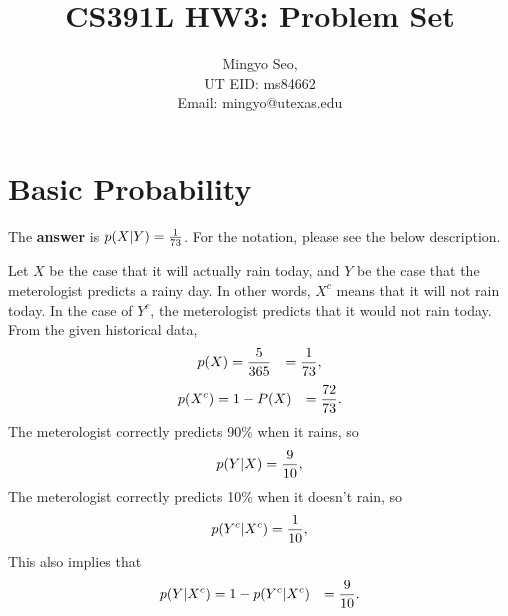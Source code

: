 \documentclass[journal,onecolumn,12pt]{IEEEtran}
\begin{document}
%
\title{CS391L HW3: Problem Set}


\author{Mingyo Seo,\\UT EID: ms84662\\Email: mingyo@utexas.edu}






\maketitle


\section{Basic Probability}

The {\bf answer} is $p(X|Y) = {{1}\over{73}}$. For the notation, please see the below description.

Let $X$ be the case that it will actually rain today, and $Y$ be the case that the meterologist predicts a rainy day. In other words, $X^{c}$ means that it will not rain today. In the case of $Y^{c}$, the meterologist predicts that it would not rain today. From the given historical data, 
\begin{equation}
\begin{aligned}
p(X)&={{5}\over{365}} &= {{1}\over{73}},
\end{aligned}
\label{eq:px}
\end{equation}
\begin{equation}
\begin{aligned}
p(X^c)&=1-P(X) &= {{72}\over{73}}.
\end{aligned}
\label{eq:pxc}
\end{equation}
The meterologist correctly predicts 90\% when it rains, so
\begin{equation}
p(Y|X)={{9}\over{10}},
\label{eq:pyx}
\end{equation}
The meterologist correctly predicts 10\% when it doesn’t rain, so
\begin{equation}
p(Y^c|X^c)={{1}\over{10}},
\end{equation}
This also implies that
\begin{equation}
\begin{aligned}
p(Y|X^c)&=1- p(Y^c|X^c)&= {{9}\over{10}}.
\label{eq:pyxc}
\end{aligned}
\end{equation}
\end{document}
